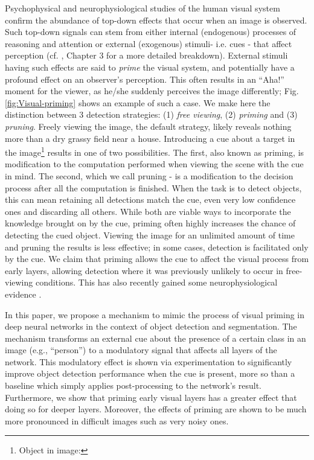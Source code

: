 \documentclass[10pt,letterpaper,twocolumn]{article}
\begin{document}
Psychophysical and neurophysiological studies of the human visual
system confirm the abundance of top-down effects that occur when an
image is observed. Such top-down signals can stem from either internal
(endogenous) processes of reasoning and attention or external (exogenous)
stimuli- i.e. cues - that affect perception (cf. \cite{tsotsos2011computational},
Chapter 3 for a more detailed breakdown). External stimuli having
such effects are said to \emph{prime} the visual system, and potentially
have a profound effect on an observer's perception. This often results
in an ``Aha!'' moment for the viewer, as he/she suddenly perceives
the image differently; Fig. \ref{fig:Visual-priming} shows an example
of such a case. We make here the distinction between 3 detection strategies:
(1) \emph{free viewing}, (2) \emph{priming }and (3) \emph{pruning}.
Freely viewing the image, the default strategy, likely reveals nothing
more than a dry grassy field near a house. Introducing a cue about
a target in the image\footnote{Object in image: \textturnt \textturna \textopeno{}}
results in one of two possibilities. The first, also known as priming,
is modification to the computation performed when viewing the scene
with the cue in mind. The second, which we call pruning - is a modification
to the decision process after all the computation is finished. When
the task is to detect objects, this can mean retaining all detections
match the cue, even very low confidence ones and discarding all others.
While both are viable ways to incorporate the knowledge brought on
by the cue, priming often highly increases the chance of detecting
the cued object. Viewing the image for an unlimited amount of time
and pruning the results is less effective; in some cases, detection
is facilitated only by the cue. We claim that priming allows the cue
to affect the visual process from early layers, allowing detection
where it was previously unlikely to occur in free-viewing conditions.
This has also recently gained some neurophysiological evidence \cite{bartsch2017attention}.

In this paper, we propose a mechanism to mimic the process of visual
priming in deep neural networks in the context of object detection
and segmentation. The mechanism transforms an external cue about the
presence of a certain class in an image (e.g., ``person'') to a
modulatory signal that affects all layers of the network. This modulatory
effect is shown via experimentation to significantly improve object
detection performance when the cue is present, more so than a baseline
which simply applies post-processing to the network's result. Furthermore,
we show that priming early visual layers has a greater effect that
doing so for deeper layers. Moreover, the effects of priming are shown
to be much more pronounced in difficult images such as very noisy
ones. 
\end{document}
